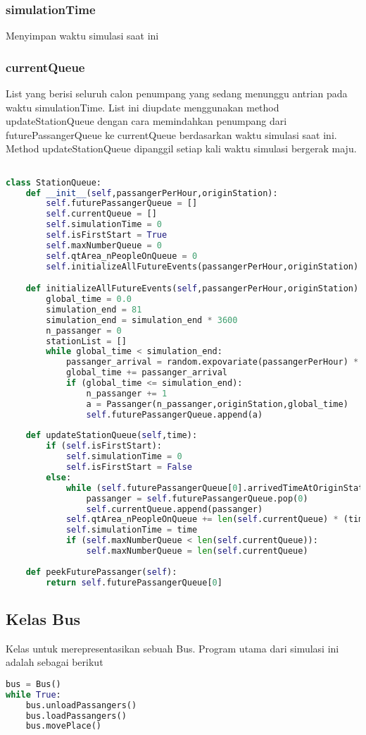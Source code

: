 \documentclass{article}
\begin{document}
\subsubsection{simulationTime}
Menyimpan waktu simulasi saat ini

\subsubsection{currentQueue}
List yang berisi seluruh calon penumpang yang sedang menunggu antrian pada waktu simulationTime. List ini diupdate menggunakan method updateStationQueue dengan cara memindahkan penumpang dari futurePassangerQueue ke currentQueue berdasarkan waktu simulasi saat ini. Method updateStationQueue dipanggil setiap kali waktu simulasi bergerak maju.


	\begin{lstlisting}[language=Python]

class StationQueue:
	def __init__(self,passangerPerHour,originStation):
		self.futurePassangerQueue = []
		self.currentQueue = []
		self.simulationTime = 0
		self.isFirstStart = True
		self.maxNumberQueue = 0
		self.qtArea_nPeopleOnQueue = 0
		self.initializeAllFutureEvents(passangerPerHour,originStation)

	def initializeAllFutureEvents(self,passangerPerHour,originStation):
		global_time = 0.0
		simulation_end = 81
		simulation_end = simulation_end * 3600
		n_passanger = 0
		stationList = []
		while global_time < simulation_end:
			passanger_arrival = random.expovariate(passangerPerHour) * 3600
			global_time += passanger_arrival
			if (global_time <= simulation_end):
				n_passanger += 1
				a = Passanger(n_passanger,originStation,global_time)
				self.futurePassangerQueue.append(a)
	
	def updateStationQueue(self,time):
		if (self.isFirstStart):
			self.simulationTime = 0
			self.isFirstStart = False
		else:
			while (self.futurePassangerQueue[0].arrivedTimeAtOriginStation <= time):
				passanger = self.futurePassangerQueue.pop(0)
				self.currentQueue.append(passanger)
			self.qtArea_nPeopleOnQueue += len(self.currentQueue) * (time - self.simulationTime)
			self.simulationTime = time
			if (self.maxNumberQueue < len(self.currentQueue)):
				self.maxNumberQueue = len(self.currentQueue)
	
	def peekFuturePassanger(self):
		return self.futurePassangerQueue[0]

\end{lstlisting}


	\subsection{Kelas Bus}
Kelas untuk merepresentasikan sebuah Bus. Program utama dari simulasi ini adalah sebagai berikut
\begin{lstlisting}[language=Python]
bus = Bus()
while True:
	bus.unloadPassangers()
	bus.loadPassangers()
	bus.movePlace()
\end{lstlisting}
\end{document}
